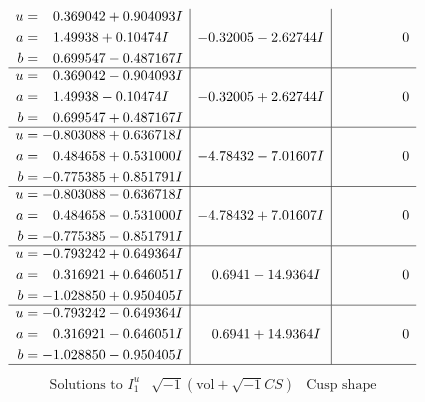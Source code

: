 \documentclass[1p]{elsarticle_modified}
\theoremstyle{definition}
\newcommand{\I}{\sqrt{-1}}
\begin{document}
$$\begin{array}{c|c|c}
\begin{aligned}
u &= \phantom{-}0.369042 + 0.904093 I \\
a &= \phantom{-}1.49938 + 0.10474 I \\
b &= \phantom{-}0.699547 - 0.487167 I\end{aligned}
 & -0.32005 - 2.62744 I & \phantom{-0.000000 } 0 \\ \hline\begin{aligned}
u &= \phantom{-}0.369042 - 0.904093 I \\
a &= \phantom{-}1.49938 - 0.10474 I \\
b &= \phantom{-}0.699547 + 0.487167 I\end{aligned}
 & -0.32005 + 2.62744 I & \phantom{-0.000000 } 0 \\ \hline\begin{aligned}
u &= -0.803088 + 0.636718 I \\
a &= \phantom{-}0.484658 + 0.531000 I \\
b &= -0.775385 + 0.851791 I\end{aligned}
 & -4.78432 - 7.01607 I & \phantom{-0.000000 } 0 \\ \hline\begin{aligned}
u &= -0.803088 - 0.636718 I \\
a &= \phantom{-}0.484658 - 0.531000 I \\
b &= -0.775385 - 0.851791 I\end{aligned}
 & -4.78432 + 7.01607 I & \phantom{-0.000000 } 0 \\ \hline\begin{aligned}
u &= -0.793242 + 0.649364 I \\
a &= \phantom{-}0.316921 + 0.646051 I \\
b &= -1.028850 + 0.950405 I\end{aligned}
 & \phantom{-}0.6941 - 14.9364 I & \phantom{-0.000000 } 0 \\ \hline\begin{aligned}
u &= -0.793242 - 0.649364 I \\
a &= \phantom{-}0.316921 - 0.646051 I \\
b &= -1.028850 - 0.950405 I\end{aligned}
 & \phantom{-}0.6941 + 14.9364 I & \phantom{-0.000000 } 0\\
 \hline 
 \end{array}$$\newpage$$\begin{array}{c|c|c}  
\text{Solutions to }I^u_{1}& \I (\text{vol} + \sqrt{-1}CS) & \text{Cusp shape}\\
 \hline 
\begin{aligned}

\end{aligned}
\end{array}$$
\end{document}
